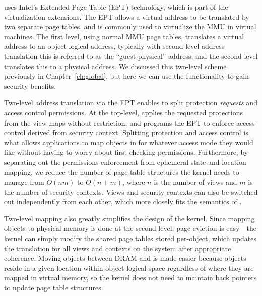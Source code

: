 \Twizzler uses Intel's Extended Page Table (EPT) technology, which is part of the virtualization
extensions. The EPT allows a virtual address to be translated by two separate page tables, and is
commonly used to virtualize the MMU in virtual machines. The first
level, using normal MMU page tables, translates a virtual address to an object-logical
address, typically with second-level address translation this is referred to as the
``guest-physical'' address, and the second-level translates this to a physical address.
We discussed this two-level scheme previously in Chapter~\ref{ch:global}, but here we can use the functionality to
gain security benefits.

Two-level address translation via the EPT enables \Twizzler to split protection \emph{requests}
and access control permissions. At the top-level, \Twizzler applies the requested protections from
the view maps without restriction, and programs the EPT to enforce access control derived from
security context. Splitting protection and access control is what allows applications to map
objects in for whatever access mode they would like without having to worry about first checking
permissions.
Furthermore, by separating out the permissions enforcement from ephemeral state and location
mapping, we reduce the number of page table structures the kernel needs to manage
from $O\left(n m\right)$ to $O\left(n + m\right)$, where $n$ is the number of views
and $m$ is the number of security contexts. Views and security contexts can also be switched out
independently from each other, which more closely fits the semantics of \Twizzler.

Two-level mapping also greatly simplifies the design of the kernel. Since mapping objects to physical memory
is done at the second level, page eviction is easy---the kernel can simply modify the shared page
tables stored per-object, which updates the translation for all views and contexts on the system after appropriate coherence. Moving objects between DRAM and \NVM is made easier
because objects reside in a given location within object-logical space regardless of where they are
mapped in virtual memory, so the kernel does not need to maintain back pointers to update page table
structures.



